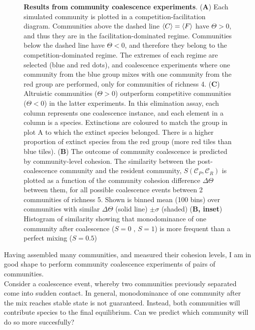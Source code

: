 \documentclass[titlepage,11pt]{article}
\begin{document}
\begin{linenumbers}
\begin{singlespace}
\begin{figure}
				\caption{\textbf{Results from community coalescence experiments}. (\textbf{A}) Each simulated community is plotted in a competition-facilitation diagram. Communities above the dashed line $ \braket{C} = \braket{F} $ have $ \Theta > 0 $, and thus they are in the facilitation-dominated regime. Communities below the dashed line have $ \Theta <0 $, and therefore they belong to the competition-dominated regime. The extremes of each regime are selected (blue and red dots), and coalescence experiments where one community from the blue group mixes with one community from the red group are performed, only for communities of richness 4. (\textbf{C}) Altruistic communities ($ \Theta > 0 $) outperform competitive communities ($ \Theta < 0 $) in the latter experiments. In this elimination assay, each column represents one coalescence instance, and each element in a column is a species. Extinctions are coloured to match the group in plot A to which the extinct species belonged. There is a higher proportion of extinct species from the red group (more red tiles than blue tiles). (\textbf{B}) The outcome of community coalescence is predicted by community-level cohesion.  The similarity between the post-coalescence community and the resident community, $ S (\mathcal{C}_P, \mathcal{C}_R) $ is plotted as a function of the community cohesion difference $ \Delta \Theta $ between them, for all possible coalescence events between 2 communities of richness 5. Shown is binned mean (100 bins) over communities with similar $ \Delta \Theta $ (solid line) $ \pm \sigma $ (shaded) (\textbf{B, inset}) Histogram of similarity showing that monodominance of one community after coalescence  ($ S = 0 \text{ , } S = 1 $) is more frequent than a perfect mixing ($ S = 0.5 $) }
				\label{fig:community_coalescence_results}
			\end{figure}
			Having assembled many communities, and measured their cohesion levels, I am in good shape to perform community coalescence experiments of pairs of communities. \\
			Consider a coalescence event, whereby two communities previously separated come into sudden contact. In general, monodominance of one community after the mix reaches stable state is not guaranteed. Instead, both communities will contribute species to the final equilibrium. Can we predict which community will do so more succesfully?\\

\end{singlespace}
\end{linenumbers}
\end{document}
